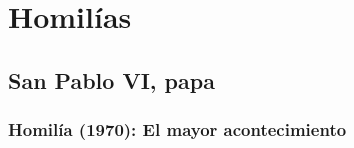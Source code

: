 \newsection 
\section{Homilías}

\subsection{San Pablo VI, papa}

\subsubsection{Homilía (1970): El mayor acontecimiento}


